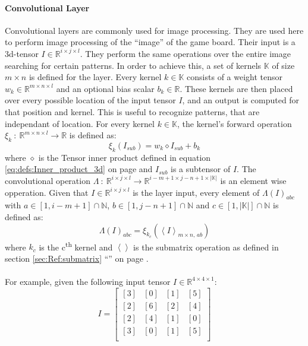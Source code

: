 \documentclass[12pt]{article}
\newcommand{\equationref}[1]{equation \ref{#1} on page \pageref{#1}}
\newcommand{\sectionref}[1]{section \ref{#1} ``\nameref{#1}'' on page \pageref{#1}}
\begin{document}
\paragraph{Convolutional Layer}
Convolutional layers are commonly used for image processing. They are used here to perform image processing of the ``image'' of the game board. Their input is a 3d-tensor \(I \in \mathbb R^{i\times j\times l}\). They perform the same operations over the entire image searching for certain patterns. In order to achieve this, a set of kernels \(\mathbb{K}\) of size \(m\times n\) is defined for the layer. Every kernel \(k\in\mathbb K\) consists of a weight tensor \(w_k \in \mathbb R^{m\times n\times l}\) and an optional bias scalar \(b_k \in\mathbb R\).
These kernels are then placed over every possible location of the input tensor \(I\), and an output is computed for that position and kernel. This is useful to recognize patterns, that are independant of location. For every kernel \(k\in \mathbb{K}\), the kernel's forward operation \(\xi_k~:~\mathbb{R}^{m \times n \times l}\to\mathbb{R}\) is defined as:
\begin{equation}\label{eq:NN:kernelOpperation}
\xi_k(I_{sub}) = w_k \diamond I_{sub} + b_k
\end{equation}
where \(\diamond\) is the Tensor inner product defined in \equationref{eq:defs:Inner_product_3d} and \(I_{sub}\) is a subtensor of \(I\).
The convolutional operation \(\Lambda~:~\mathbb{R}^{i\times j \times l}\to\mathbb{R}^{i-m+1 \times j-n+1 \times |\mathbb{K}|}\) is an element wise opperation. Given that  \(I \in \mathbb{R}^{i\times j\times l}\) is the layer input, every element of \(\Lambda(I)_{abc}\) with \(a \in [1, i-m+1]\cap\mathbb N\), \(b \in [1, j-n+1]\cap\mathbb N\) and \(c \in [1, |\mathbb{K}|]\cap\mathbb N\) is defined as:
\begin{equation}\label{eq:NN:convolutional_opperation}
\Lambda(I)_{abc} = \xi_{k_c}(\left<I\right>_{m\times n,\,ab})
\end{equation}
where \(k_c\) is the c\textsuperscript{th} kernel and \(\left<\right>\) is the submatrix operation as defined in \sectionref{sec:Ref:submatrix}.
\\\\\noindent
For example, given the following input tensor \(I \in\mathbb{R}^{4\times4\times1}\): %
\[
I = \left[
\begin{matrix}
[3] & [0] & [1] & [5] \\
[2] & [6] & [2] & [4] \\
[2] & [4] & [1] & [0] \\
[3] & [0] & [1] & [5] \\
\end{matrix}
\right]
\]
\end{document}

